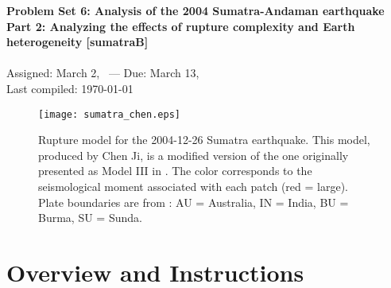 \documentclass[11pt,titlepage,fleqn]{article}
\begin{document}

\begin{spacing}{1.2} 
\centering
{\large \bf Problem Set 6: Analysis of the 2004 Sumatra-Andaman earthquake \\
Part 2: Analyzing the effects of rupture complexity and Earth heterogeneity [sumatraB]} \\
\cltag\ \\
Assigned: March 2, \cyear\ --- Due: March 13, \cyear\ \\
Last compiled: \today
\end{spacing}


\begin{figure}[h]
\centering
\texttt{[image: sumatra\_chen.eps]}
\caption[]
{{
Rupture model for the 2004-12-26  Sumatra earthquake.
This model, produced by Chen Ji, is a modified version of the one originally presented as Model III in \citet[][Figure~5c]{Ammon2005}.
The color corresponds to the seismological moment associated with each patch (red = large).
Plate boundaries are from \citet{Bird2003}: AU = Australia, IN = India, BU = Burma, SU = Sunda.
}}
\label{fig:sumatra_chen}
\end{figure}


\clearpage\pagebreak
\section*{Overview and Instructions}
\end{document}
